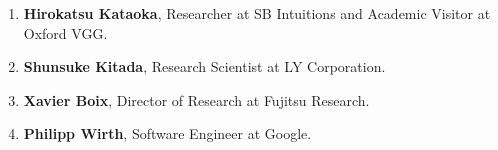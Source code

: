 \documentclass{article}
\begin{document}
\begin{enumerate}
    \item {\bf Hirokatsu Kataoka}, Researcher at SB Intuitions and Academic Visitor at Oxford VGG.

    \item {\bf Shunsuke Kitada}, Research Scientist at LY Corporation.

    \item {\bf Xavier Boix}, Director of Research at Fujitsu Research.

    \item {\bf Philipp Wirth}, Software Engineer at Google.


\end{enumerate}
\end{document}
